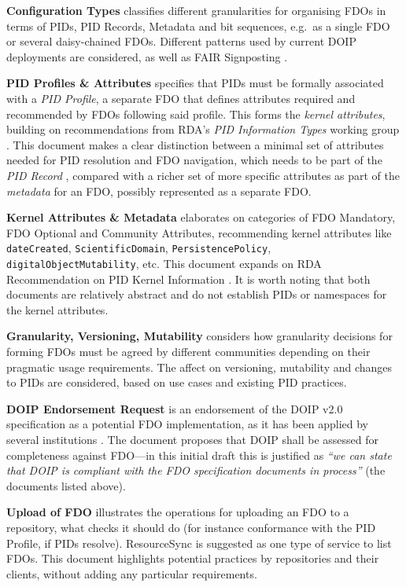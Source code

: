 \textbf{Configuration Types} \cite{Lannom 2022a} classifies different granularities for organising FDOs in terms of PIDs, PID Records, Metadata and bit sequences, e.g.~as a single FDO or several daisy-chained FDOs. Different patterns used by current DOIP deployments are considered, as well as FAIR Signposting \cite{Van de Sompel 2015,Van de Sompel 2022}.

\textbf{PID Profiles \& Attributes} \cite{Anders 2022} specifies that PIDs must be formally associated with a \emph{PID Profile}, a separate FDO that defines attributes required and recommended by FDOs following said profile. This forms the \emph{kernel attributes}, building on recommendations from RDA's \emph{PID Information Types} working group \cite{Weigel 2018}. This document makes a clear distinction between a minimal set of attributes needed for PID resolution and FDO navigation, which needs to be part of the \emph{PID Record} \cite{Islam 2023}, compared with a richer set of more specific attributes as part of the \emph{metadata} for an FDO, possibly represented as a separate FDO.

\textbf{Kernel Attributes \& Metadata} \cite{Weigel 2022} elaborates on categories of FDO Mandatory, FDO Optional and Community Attributes, recommending kernel attributes like \texttt{dateCreated}, \texttt{ScientificDomain}, \texttt{PersistencePolicy}, \texttt{digitalObjectMutability}, etc. This document expands on RDA Recommendation on PID Kernel Information \cite{Weigel 2018}. It is worth noting that both documents are relatively abstract and do not establish PIDs or namespaces for the kernel attributes.

\textbf{Granularity, Versioning, Mutability} \cite{Hellström 2022} considers how granularity decisions for forming FDOs must be agreed by different communities depending on their pragmatic usage requirements. The affect on versioning, mutability and changes to PIDs are considered, based on use cases and existing PID practices.

\textbf{DOIP Endorsement Request} \cite{Schwardmann 2022a} is an endorsement of the \acrshort{DOIP} v2.0 \cite{DONA 2018} specification as a potential FDO implementation, as it has been applied by several institutions \cite{Wittenburg 2022a}. The document proposes that DOIP shall be assessed for completeness against FDO---in this initial draft this is justified as \emph{``we can state that DOIP is compliant with the FDO specification documents in process''} (the documents listed above).

\textbf{Upload of FDO} \cite{Blanchi 2022} illustrates the operations for uploading an FDO to a repository, what checks it should do (for instance conformance with the PID Profile, if PIDs resolve). ResourceSync \cite{ANSI/NISO Z39.99-2017} is suggested as one type of service to list FDOs. This document highlights potential practices by repositories and their clients, without adding any particular requirements.

